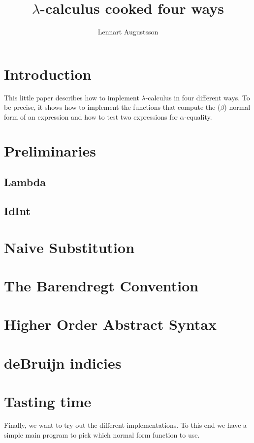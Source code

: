 \documentclass{article}
\date{}
\title{
$\lambda$-calculus cooked four ways
}
\author{
Lennart Augustsson
}
\begin{document}
\maketitle


\section{Introduction}
This little paper describes how to implement $\lambda$-calculus in
four different ways.  To be precise, it shows how to implement the
functions that compute the ($\beta$) normal form of an expression
and how to test two expressions for $\alpha$-equality.

\section{Preliminaries}
\subsection{Lambda}

\subsection{IdInt}


\section{Naive Substitution}


\section{The Barendregt Convention}


\section{Higher Order Abstract Syntax}


\section{deBruijn indicies}


\section{Tasting time}
Finally, we want to try out the different implementations.
To this end we have a simple main program to pick which
normal form function to use.


\end{document}
